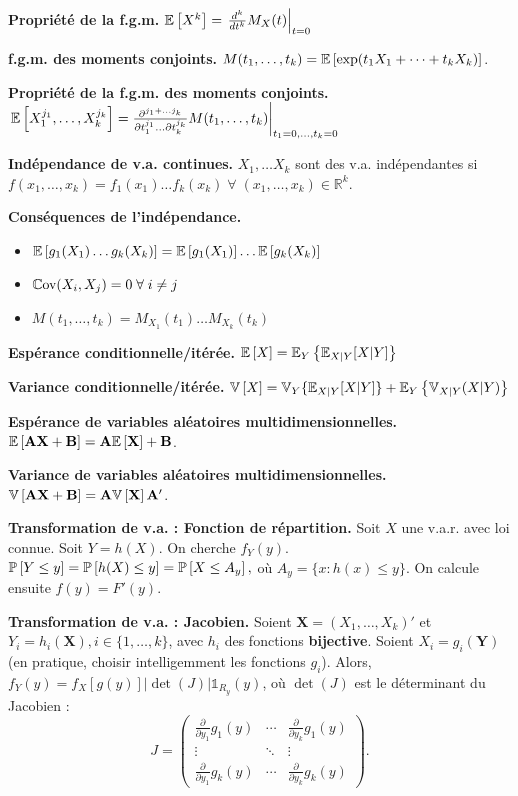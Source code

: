 \textbf{Propriété de la f.g.m.} $\mathbb{E}\left[{X^k}\right] = \left.\frac{d^k}{dt^k}M_X(t)\right|_{t=0}$

\textbf{f.g.m. des moments conjoints.} $M(t_1,\dots,t_k) = \mathbb{E}\left[{\exp(t_1X_1+\dots+t_kX_k)}\right]$.

\textbf{Propriété de la f.g.m. des moments conjoints.} $\left. \mathbb{E}\left[{X_1^{j_1}, \dots, X_k^{j_k}}\right] = \frac{\partial^{j_1+\dots j_k}}{\partial t_1^{j_1} \dots \partial t_k^{j_k}} M(t_1,\dots,t_k) \right|_{t_1=0,\dots,t_k=0}$

\textbf{Indépendance de v.a. continues.} $X_1, \dots X_k$ sont des v.a. indépendantes si $f(x_1, \dots, x_k)=f_1(x_1)\dots f_k(x_k) \; \forall \; (x_1,\dots,x_k) \in \mathbb{R}^k$.

\textbf{Conséquences de l'indépendance.} 
\begin{itemize}
	\item $\mathbb{E}\left[{g_1(X_1)\dots g_k(X_k)}\right] = \mathbb{E}\left[{g_1(X_1)}\right] \dots \mathbb{E}\left[{g_k(X_k)}\right]$ 
	\item $\mathbb{C}\text{ov}(X_i,X_j) = 0 \; \forall \; i \ne j$
	\item $ M(t_1, \dots, t_k) = M_{X_1}(t_1) \dots M_{X_k}(t_k)$
\end{itemize}

\textbf{Espérance conditionnelle/itérée.} $\mathbb{E}\left[{X}\right] = \mathbb{E}_Y \left\{ \mathbb{E}_{X|Y}[X|Y] \right\}$

\textbf{Variance conditionnelle/itérée.} $\mathbb{V}\left[{X}\right] = \mathbb{V}_Y \{ \mathbb{E}_{X|Y}[X|Y] \} + \mathbb{E}_Y \left\{ \mathbb{V}_{X|Y}(X|Y) \right\}$

\textbf{Espérance de variables aléatoires multidimensionnelles.} $\mathbb{E}\left[{\mathbf{A} \mathbf{X} + \mathbf{B}}\right] = \mathbf{A}\mathbb{E}\left[{\mathbf{X}}\right] + \mathbf{B}$.

\textbf{Variance de variables aléatoires multidimensionnelles.} $\mathbb{V}\left[{\mathbf{A} \mathbf{X} + \mathbf{B}}\right] = \mathbf{A}\mathbb{V}\left[{\mathbf{X}}\right]\mathbf{A}'$.

\textbf{Transformation de v.a. : Fonction de répartition.} Soit $X$ une v.a.r. avec loi connue. Soit $Y= h(X)$. On cherche $f_Y(y)$. $\mathbb{P}\left[{Y \le y}\right] = \mathbb{P}\left[{h(X) \le y}\right] = \mathbb{P}\left[{X \le A_y}\right],$ où $A_y=\{x:h(x)\le y\}$. On calcule ensuite $f(y) = F'(y)$.


\textbf{Transformation de v.a. : Jacobien.} Soient $\mathbf{X} = (X_1, \dots, X_k)'$ et $Y_i= h_i(\mathbf{X}), i \in \{1,\dots,k\}$, avec $h_i$ des fonctions \textbf{bijective}. Soient $X_i = g_i(\mathbf{Y})$ (en pratique, choisir intelligemment les fonctions $g_i$). Alors, $f_Y(y) = f_X\left[g(y)\right]|\det(J)|\mathds{1}_{R_y}(y)$, où $\det(J)$ est le déterminant du Jacobien :
\begin{equation}
	J = 
	\begin{pmatrix}
		\frac{\partial}{\partial y_1}g_1(y) & \cdots & \frac{\partial}{\partial y_k}g_1(y)\\
		\vdots & \ddots & \vdots \\
		\frac{\partial}{\partial y_1}g_k(y) & \cdots& \frac{\partial}{\partial y_k}g_k(y)
	\end{pmatrix}.
\end{equation}

